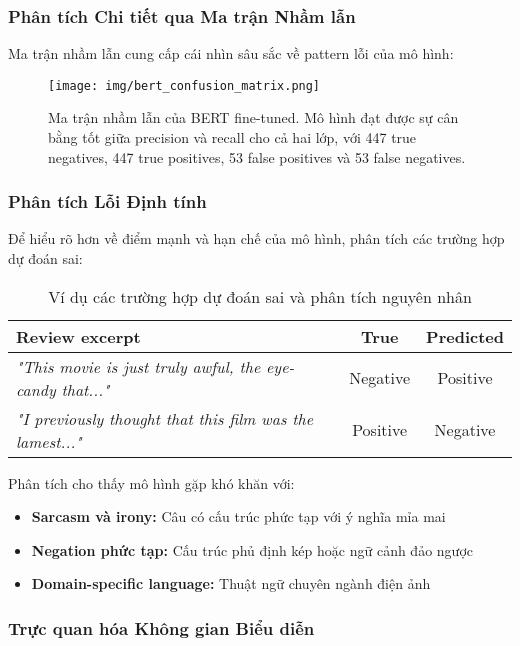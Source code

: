 \subsubsection{Phân tích Chi tiết qua Ma trận Nhầm lẫn}

Ma trận nhầm lẫn cung cấp cái nhìn sâu sắc về pattern lỗi của mô hình:

\begin{figure}[H]
    \centering
    \texttt{[image: img/bert\_confusion\_matrix.png]}
    \caption{Ma trận nhầm lẫn của BERT fine-tuned. Mô hình đạt được sự cân bằng tốt giữa precision và recall cho cả hai lớp, với 447 true negatives, 447 true positives, 53 false positives và 53 false negatives.}
    \label{fig:confusion_matrix_detailed}
\end{figure}

\subsubsection{Phân tích Lỗi Định tính}

Để hiểu rõ hơn về điểm mạnh và hạn chế của mô hình, phân tích các trường hợp dự đoán sai:

\begin{table}[H]
\centering
\caption{Ví dụ các trường hợp dự đoán sai và phân tích nguyên nhân}
\label{tab:error_analysis}
\begin{tabular}{p{7cm}cc}
\toprule
\textbf{Review excerpt} & \textbf{True} & \textbf{Predicted} \\
\midrule
\textit{"This movie is just truly awful, the eye-candy that..."} & Negative & Positive \\
\textit{"I previously thought that this film was the lamest..."} & Positive & Negative \\
\toprule
\end{tabular}
\end{table}

Phân tích cho thấy mô hình gặp khó khăn với:
\begin{itemize}
    \item \textbf{Sarcasm và irony:} Câu có cấu trúc phức tạp với ý nghĩa mỉa mai
    \item \textbf{Negation phức tạp:} Cấu trúc phủ định kép hoặc ngữ cảnh đảo ngược
    \item \textbf{Domain-specific language:} Thuật ngữ chuyên ngành điện ảnh
\end{itemize}

\subsubsection{Trực quan hóa Không gian Biểu diễn}

